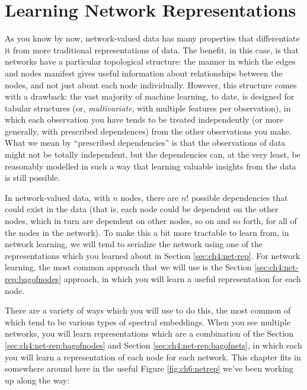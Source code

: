 \chapter{Learning Network Representations}
\label{sec:ch6}

As you know by now, network-valued data has many properties that differentiate it from more traditional representations of data. The benefit, in this case, is that networks have a particular topological structure: the manner in which the edges and nodes manifest gives useful information about relationships between the nodes, and not just about each node individually. However, this structure comes with a drawback: the vast majority of machine learning, to date, is designed for tabular structures (or, \emph{multivariate}, with multiple features per observation), in which each observation you have tends to be treated independently (or more generally, with prescribed dependences) from the other observations you make. What we mean by ``prescribed dependencies'' is that the observations of data might not be {totally} independent, but the dependencies can, at the very least, be reasonably modelled in such a way that learning valuable insights from the data is still possible. 

In network-valued data, with $n$ nodes, there are $n!$ possible dependencies that could exist in the data (that is, each node could be dependent on the other nodes, which in turn are dependent on other nodes, so on and so forth, for all of the nodes in the network). To make this a bit more tractable to learn from, in network learning, we will tend to serialize the network using one of the representations which you learned about in Section \ref{sec:ch4:net-rep}. For network learning, the most common approach that we will use is the Section \ref{sec:ch4:net-rep:bagofnodes} approach, in which you will learn a useful representation for each node. 

There are a variety of ways which you will use to do this, the most common of which tend to be various types of spectral embeddings. When you see multiple networks, you will learn representations which are a combination of the Section \ref{sec:ch4:net-rep:bagofnodes} and Section \ref{sec:ch4:net-rep:bagofnets}, in which each you will learn a representation of each node for each network. This chapter fits in somewhere around here in the useful Figure \ref{fig:ch6:netrep} we've been working up along the way:

